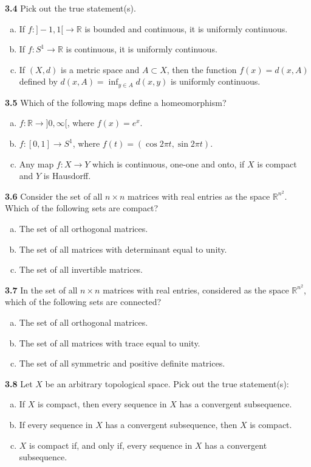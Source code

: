 \documentclass[11pt,a4paper]{article}
\newcommand{\R}{\mathbb{R}}
\newcommand{\qitem}[1]{\par\medskip\noindent\textbf{#1}\hspace{0.5em}}
\begin{document}
\qitem{3.4} Pick out the true statement(s).
\begin{enumerate}[(a)]
  \item If $f : ]-1, 1[ \to \R$ is bounded and continuous, it is uniformly continuous.
  \item If $f : S^1 \to \R$ is continuous, it is uniformly continuous.
  \item If $(X, d)$ is a metric space and $A \subset X$, then the function $f(x) = d(x, A)$ defined by $d(x, A) = \inf_{y \in A} d(x, y)$ is uniformly continuous.
\end{enumerate}

\qitem{3.5} Which of the following maps define a homeomorphism?
\begin{enumerate}[(a)]
  \item $f : \R \to ]0, \infty[$, where $f(x) = e^x$.
  \item $f : [0, 1] \to S^1$, where $f(t) = (\cos 2\pi t, \sin 2\pi t)$.
  \item Any map $f : X \to Y$ which is continuous, one-one and onto, if $X$ is compact and $Y$ is Hausdorff.
\end{enumerate}

\qitem{3.6} Consider the set of all $n \times n$ matrices with real entries as the space $\R^{n^2}$. Which of the following sets are compact?
\begin{enumerate}[(a)]
  \item The set of all orthogonal matrices.
  \item The set of all matrices with determinant equal to unity.
  \item The set of all invertible matrices.
\end{enumerate}

\qitem{3.7} In the set of all $n \times n$ matrices with real entries, considered as the space $\R^{n^2}$, which of the following sets are connected?
\begin{enumerate}[(a)]
  \item The set of all orthogonal matrices.
  \item The set of all matrices with trace equal to unity.
  \item The set of all symmetric and positive definite matrices.
\end{enumerate}

\qitem{3.8} Let $X$ be an arbitrary topological space. Pick out the true statement(s):
\begin{enumerate}[(a)]
  \item If $X$ is compact, then every sequence in $X$ has a convergent subsequence.
  \item If every sequence in $X$ has a convergent subsequence, then $X$ is compact.
  \item $X$ is compact if, and only if, every sequence in $X$ has a convergent subsequence.
\end{enumerate}
\end{document}
